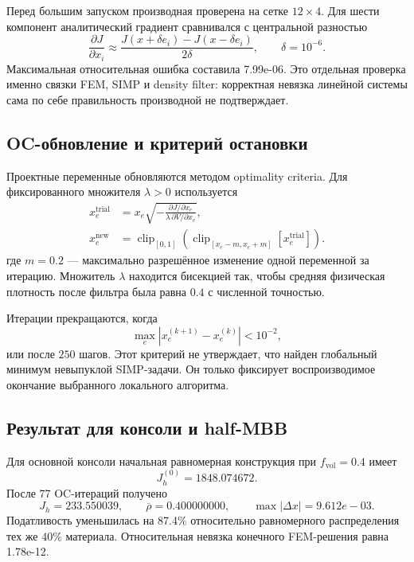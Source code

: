 Перед большим запуском производная проверена на сетке $12\times4$. Для шести компонент аналитический градиент сравнивался с центральной разностью
\begin{equation}
\label{eq:practical-v03-finite-difference}
 \frac{\partial J}{\partial x_i}
 \approx
 \frac{J(x+\delta e_i)-J(x-\delta e_i)}{2\delta},
 \qquad
 \delta=10^{-6}.
\end{equation}
Максимальная относительная ошибка составила 7.99e-06. Это отдельная проверка именно связки FEM, SIMP и density filter: корректная невязка линейной системы сама по себе правильность производной не подтверждает.

\subsection{OC-обновление и критерий остановки}
\label{subsec:practical-v03-oc}

Проектные переменные обновляются методом optimality criteria. Для фиксированного множителя $\lambda>0$ используется
\begin{equation}
\label{eq:practical-v03-oc-update}
 \begin{aligned}
 x_e^{\mathrm{trial}}
 &=
 x_e
 \sqrt{
 -\frac{\partial J/\partial x_e}
 {\lambda\,\partial V/\partial x_e}
 },\\
 x_e^{\mathrm{new}}
 &=
 \operatorname{clip}_{[0,1]}
 \left(
 \operatorname{clip}_{[x_e-m,x_e+m]}
 \left[x_e^{\mathrm{trial}}\right]
 \right).
 \end{aligned}
\end{equation}
где $m=0.2$ --- максимально разрешённое изменение одной переменной за итерацию. Множитель $\lambda$ находится бисекцией так, чтобы средняя физическая плотность после фильтра была равна $0.4$ с численной точностью.

Итерации прекращаются, когда
\begin{equation}
 \max_e|x_e^{(k+1)}-x_e^{(k)}|<10^{-2},
\end{equation}
или после $250$ шагов. Этот критерий не утверждает, что найден глобальный минимум невыпуклой SIMP-задачи. Он только фиксирует воспроизводимое окончание выбранного локального алгоритма.

\subsection{Результат для консоли и half-MBB}
\label{subsec:practical-v03-results}

Для основной консоли начальная равномерная конструкция при $f_{\mathrm{vol}}=0.4$ имеет
\begin{equation}
 J_h^{(0)}=1848.074672.
\end{equation}
После 77 OC-итераций получено
\begin{equation}
\label{eq:practical-v03-cantilever-final}
 J_h=233.550039,
 \qquad
 \overline{\rho}=0.400000000,
 \qquad
 \max|\Delta x|=9.612e-03.
\end{equation}
Податливость уменьшилась на 87.4\% относительно равномерного распределения тех же $40\%$ материала. Относительная невязка конечного FEM-решения равна 1.78e-12.

